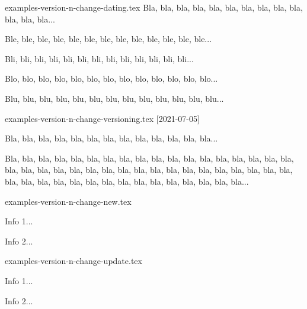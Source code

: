 \begin{filecontents*}{examples-version-n-change-dating.tex}
Bla, bla, bla, bla, bla, bla, bla, bla, bla, bla, bla, bla, bla...

\medskip %


Ble, ble, ble, ble, ble, ble, ble, ble, ble, ble, ble, ble, ble...

\medskip %


Bli, bli, bli, bli, bli, bli, bli, bli, bli, bli, bli, bli, bli...

Blo, blo, blo, blo, blo, blo, blo, blo, blo, blo, blo, blo, blo...

Blu, blu, blu, blu, blu, blu, blu, blu, blu, blu, blu, blu, blu...

\end{filecontents*}


\begin{filecontents*}{examples-version-n-change-versioning.tex}
[2021-07-05]

Bla, bla, bla, bla, bla, bla, bla, bla, bla, bla, bla, bla, bla...

\bigskip %


Bla, bla, bla, bla, bla, bla, bla, bla, bla, bla, bla, bla, bla,
bla, bla, bla, bla, bla, bla, bla, bla, bla, bla, bla, bla, bla,
bla, bla, bla, bla, bla, bla, bla, bla, bla, bla, bla, bla, bla,
bla, bla, bla, bla, bla, bla, bla, bla, bla, bla, bla, bla...

\end{filecontents*}


\begin{filecontents*}{examples-version-n-change-new.tex}
\begin{bdocnew}
    \item Info 1...
    \item Info 2...
\end{bdocnew}

\end{filecontents*}


\begin{filecontents*}{examples-version-n-change-update.tex}
\begin{bdocupdate}
    \item Info 1...
    \item Info 2...
\end{bdocupdate}


\end{filecontents*}


